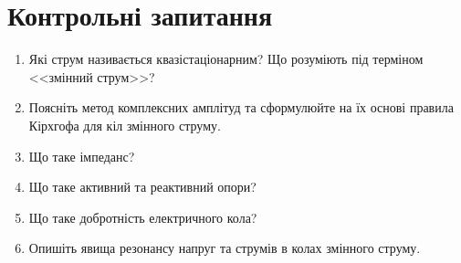 \documentclass[]{LabWork}
\begin{document}
\section*{Контрольні запитання}

\begin{enumerate}
	\item Які струм називається квазістаціонарним? Що розуміють під терміном <<змінний струм>>?
	\item Поясніть метод комплексних амплітуд та сформулюйте на їх основі правила Кірхгофа для кіл змінного струму.
	\item Що таке імпеданс?
	\item Що таке активний та реактивний опори?
	\item Що таке добротність електричного кола?
	\item Опишіть явища резонансу напруг та струмів в колах змінного струму.
\end{enumerate}
\end{document}
